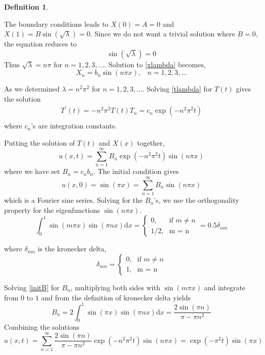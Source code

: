 \documentclass[12pt, oneside]{book}
\theoremstyle{plain}
\theoremstyle{definition}
\newtheorem{definition}[theorem]{Definition}
\begin{document}
\begin{definition}
\begin{itemize}
The boundary conditions leads to $ X(0) = A = 0$ and $ X(1) = B \sin(\sqrt{\lambda}) = 0$. Since we do not want a trivial solution where $B = 0$, the equation reduces to 
\begin{equation}
\sin(\sqrt{\lambda}) = 0
\end{equation} 
Thus $ \sqrt{\lambda} = n \pi $ for $n = 1,2,3, ...$. 
Solution to \ref{xlambda} becomes,
\begin{equation}
X_n = b_n \sin(n \pi x), \hspace{10pt} n=1,2,3, ...
\end{equation}
\end{itemize}

As we determined $ \lambda = n^2 \pi^2 $ for $n = 1,2,3, ...$.  Solving \ref{tlambda} for $T(t)$ gives the solution
\begin{eqnarray}
T^{'}(t) = -n^2 \pi^2 T(t)
T_n = c_n \exp(-n^2 \pi ^2 t) \\[10pt]
\end{eqnarray}
where $c_n$'s are integration constants.

Putting the solution of $T(t)$ and $X(x)$ together,
\begin{equation}
u(x,t) = \sum_{n=1}^{\infty} B_n \exp(-n^2 \pi ^2 t) \sin(n \pi x)
\end{equation}
where we have set $B_n = c_n b_n$. The initial condition gives
\begin{equation} \label{initB}
u(x,0) = \sin(\pi x) = \sum_{n=1}^{\infty} B_n \sin(n \pi x)
\end{equation}
which is a Fourier sine series.  Solving for the $B_n$’s, we use the orthogonality property for the eigenfunctions $\sin(n \pi x)$.
    \[ \int_{0}^{1} \sin(m \pi x) \sin(\pi n x) \mathrm{d}x = \begin{cases} \mbox{0,} & \mbox{if } m \neq n \\ \mbox{1/2,} & \mbox{m = n} \end{cases} = 0.5 \delta _{mn} \]
    
where $ \delta _{mn}$ is the kronecker delta,  
\[  \delta _{mn} = \begin{cases} \mbox{0,} & \mbox{if } m \neq n \\ \mbox{1,} & \mbox{m = n} \end{cases} \]

Solving \ref{initB} for $B_n$, multiplying both sides with $\sin(m \pi x)$ and integrate from $0$ to $1$ and from the definition of kronecker delta yields
\begin{equation}
B_n = 2 \int_{0}^{1} \sin(\pi x) \sin(\pi n x) \mathrm{d}x = \frac{2 \sin(\pi n)}{\pi - \pi n^2}
\end{equation}
Combining the solutions
\begin{equation}
u(x,t) = \sum_{n=1}^{\infty} \frac{2 \sin(\pi n)}{\pi - \pi n^2} \exp(-n^2 \pi ^2 t) \sin(n \pi x)= \exp(-\pi^2 t) \sin(\pi x) 
\end{equation}
\end{definition}
\end{document}
